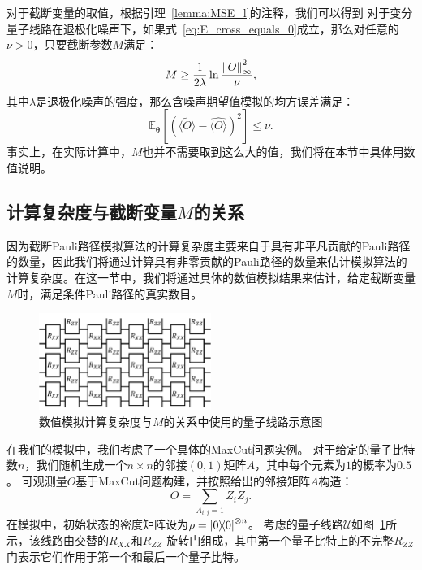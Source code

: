 对于截断变量的取值，根据引理~\ref{lemma:MSE_l}的注释，我们可以得到
对于变分量子线路在退极化噪声下，如果式~\eqref{eq:E_cross_equals_0}成立，那么对任意的$\nu > 0$，只要截断参数$M$满足：
\begin{equation}\label{eq:depolarizing_M}
    M\geq\frac{1}{2\lambda}\ln{\frac{\norm{O}_\infty^2}{\nu}},
\end{equation}
其中$\lambda$是退极化噪声的强度，那么含噪声期望值模拟的均方误差满足：
\begin{equation}
    \mathbb{E}_{\bm{\theta}}\left[\left(\widetilde{\langle O\rangle}-\widehat{\langle O\rangle}\right)^2\right]\leq\nu.
\end{equation}
事实上，在实际计算中，$M$也并不需要取到这么大的值，我们将在本节中具体用数值说明。

\subsection{计算复杂度与截断变量$M$的关系}

因为截断Pauli路径模拟算法的计算复杂度主要来自于具有非平凡贡献的Pauli路径的数量，因此我们将通过计算具有非零贡献的Pauli路径的数量来估计模拟算法的计算复杂度。在这一节中，我们将通过具体的数值模拟结果来估计，给定截断变量$M$时，满足条件Pauli路径的真实数目。


\begin{figure}[htbp]
    \centering
    \includegraphics[width=0.5\textwidth]{figures/XX_ZZ_Ansatz.pdf}
    \caption{数值模拟计算复杂度与$M$的关系中使用的量子线路示意图}\label{fig:XX_ZZ_Ansatz}
\end{figure}

在我们的模拟中，我们考虑了一个具体的MaxCut问题实例。
对于给定的量子比特数$n$，我们随机生成一个$n\times n$的邻接$(0,1)$矩阵$A$，其中每个元素为$1$的概率为$0.5$。
可观测量$O$基于MaxCut问题构建，并按照给出的邻接矩阵$A$构造：
\begin{equation}
    O=\sum_{A_{i,j}=1} Z_iZ_j.
\end{equation}
在模拟中，初始状态的密度矩阵设为$\rho=\ketbra{0}{0}^{\otimes n}$。
考虑的量子线路$\mathcal{U}$如图~\ref{fig:XX_ZZ_Ansatz}所示，该线路由交替的$R_{XX}$和$R_{ZZ}$ 旋转门组成，其中第一个量子比特上的不完整$R_{ZZ}$门表示它们作用于第一个和最后一个量子比特。


